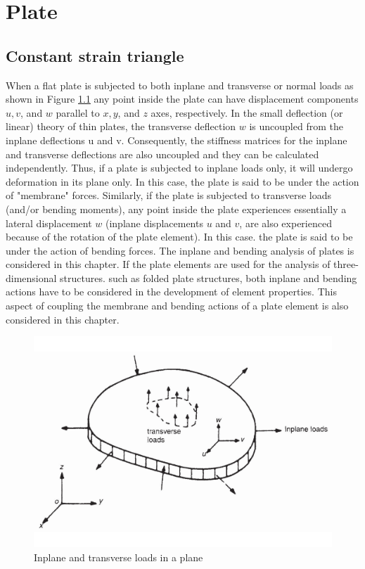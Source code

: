 
\chapter{Plate}

\section{Constant strain triangle}
When a flat plate is subjected to both inplane and transverse or normal loads as shown
in Figure \ref{fig: inplane transverse loads in plane} any point inside the plate can have displacement components $ u, v $, and
$ w $ parallel to $ x, y $, and $ z $ axes, respectively. In the small deflection (or linear) theory of thin plates, the transverse deflection $ w $ is uncoupled from the inplane deflections u and v. Consequently, the stiffness matrices for the inplane and transverse deflections are also uncoupled and they can be calculated independently. Thus, if a plate is subjected to inplane loads only, it will undergo deformation in its plane only. In this case, the plate is said to be under the action of "membrane" forces. Similarly, if the plate is subjected to transverse loads (and/or bending moments), any point inside the plate experiences
essentially a lateral displacement $ w $ (inplane displacements $ u $ and $ v $, are also experienced because of the rotation of the plate element). In this case. the plate is said to be under the action of bending forces. The inplane and bending analysis of plates is considered in this chapter. If the plate elements are used for the analysis of three-dimensional structures. such as folded plate structures, both inplane and bending actions have to be considered in the development of element properties. This aspect of coupling the membrane and bending actions of a plate element is also considered in this chapter.

\begin{figure}[h!]
\centering
\includegraphics[width=0.5\linewidth]{figure/inplane_transverse_loads_in_plane}
\caption{Inplane and transverse loads in a plane}
\label{fig: inplane transverse loads in plane}
\end{figure}

